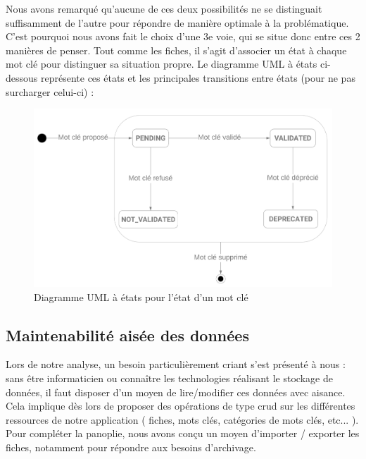 Nous avons remarqué qu'aucune de ces deux possibilités ne se distinguait suffisamment de l'autre pour répondre de manière optimale à la problématique.
C'est pourquoi nous avons fait le choix d'une 3e voie, qui se situe donc entre ces 2 manières de penser. Tout comme les fiches, il s'agit d'associer un état à chaque mot clé pour distinguer sa situation propre. Le diagramme UML à états ci-dessous représente ces états et les principales transitions entre états (pour ne pas surcharger celui-ci) :

\begin{figure}[H]
    \includegraphics[width=\textwidth,height=\textheight,keepaspectratio]{images/StateTags.png}
    \centering
    \caption{Diagramme UML à états pour l'état d'un mot clé}
    \label{pic:stateDiagramForTags}
\end{figure}

\subsection*{Maintenabilité aisée des données}

Lors de notre analyse, un besoin particulièrement criant s'est présenté à nous : sans être informaticien ou connaître les technologies réalisant le stockage de données, il faut disposer d'un moyen de lire/modifier ces données avec aisance. \\

Cela implique dès lors de proposer des opérations de type \Gls{crud} sur les différentes ressources de notre application ( fiches, mots clés, catégories de mots clés, etc... ). Pour compléter la panoplie, nous avons conçu un moyen d'importer / exporter les fiches, notamment pour répondre aux besoins d'archivage.


